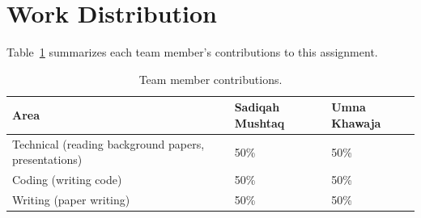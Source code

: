\section{Work Distribution}

Table~\ref{tab:work} summarizes each team member's contributions to this assignment.

\begin{table}[h]
\centering
\caption{Team member contributions.}
\label{tab:work}
\renewcommand{\arraystretch}{1.25}
\begin{tabular}{@{}p{}p{}p{}@{}}
\toprule
\textbf{Area} & \textbf{Sadiqah Mushtaq} & \textbf{Umna Khawaja} \\
\midrule
Technical (reading background papers, presentations) & 50\% & 50\% \\
Coding (writing code) & 50\% & 50\% \\
Writing (paper writing) & 50\% & 50\% \\
\bottomrule
\end{tabular}
\end{table}
